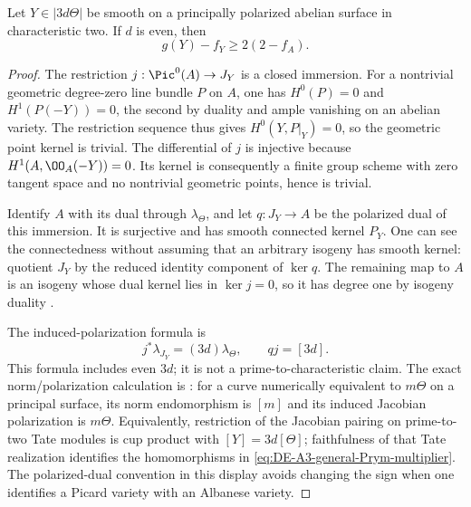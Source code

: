 \begin{lemma}
\label{lem:DE-A3-ppav-even-bound}
Let $Y\in|3d\Theta|$ be smooth on a principally polarized abelian
surface in characteristic two.  If $d$ is even, then
\[
                         g(Y)-f_Y\ge2(2-f_A).
\]
\end{lemma}
\begin{proof}
The restriction $j:\Pic^0(A)\to J_Y$ is a closed immersion.
For a nontrivial geometric degree-zero line bundle $P$ on $A$, one has
$H^0(P)=0$ and $H^1(P(-Y))=0$, the second by duality and ample
vanishing on an abelian variety.  The restriction sequence thus gives
$H^0(Y,P|_Y)=0$, so the geometric point kernel is trivial.
The differential of $j$ is injective because $H^1(A,\OO_A(-Y))=0$.
Its kernel is consequently a finite group scheme with zero tangent
space and no nontrivial geometric points, hence is trivial.

Identify $A$ with its dual through $\lambda_\Theta$, and let
$q:J_Y\to A$ be the polarized dual of this immersion.  It is
surjective and has smooth connected kernel $P_Y$.  One can see the
connectedness without assuming that an arbitrary isogeny has smooth
kernel: quotient $J_Y$ by the reduced identity component of $\ker q$.
The remaining map to $A$ is an isogeny whose dual kernel lies in
$\ker j=0$, so it has degree one by isogeny duality
\cite[Theorem~7.5, p.~100]{EdixhovenVanDerGeerMoonenAV}.

The induced-polarization formula is
\begin{equation}\label{eq:DE-A3-general-Prym-multiplier}
                       j^*\lambda_{J_Y}=(3d)\lambda_\Theta,
                       \qquad qj=[3d].
\end{equation}
This formula includes even $3d$; it is not a prime-to-characteristic
claim.  The exact norm/polarization calculation is
\cite[Section~3, equations~(3.2)--(3.3), pp.~346--347]{Debarre1994Degrees}:
for a curve numerically equivalent to $m\Theta$ on a principal surface,
its norm endomorphism is $[m]$ and its induced Jacobian polarization is
$m\Theta$.  Equivalently, restriction of the Jacobian pairing on
prime-to-two Tate modules is cup product with $[Y]=3d[\Theta]$;
faithfulness of that Tate realization identifies the homomorphisms in
\eqref{eq:DE-A3-general-Prym-multiplier}.  The polarized-dual convention
in this display avoids changing the sign when one identifies a Picard
variety with an Albanese variety.


\end{proof}
